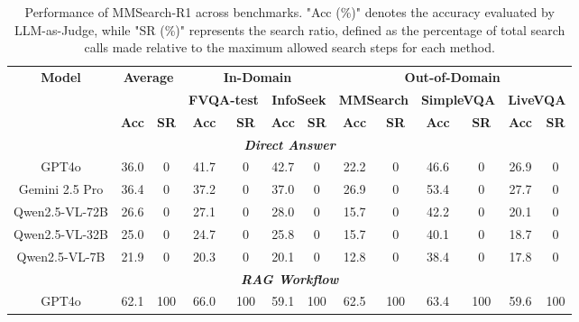 \documentclass{article}
\begin{document}
\begin{table}[t]
\footnotesize
\centering
\caption{Performance of MMSearch-R1 across benchmarks. 
"Acc (\%)" denotes the accuracy evaluated by LLM-as-Judge, while "SR (\%)" represents the search ratio, defined as the percentage of total search calls made relative to the maximum allowed search steps for each method.}
\label{tab:finding-1}
\setlength{\tabcolsep}{4.5pt}
\begin{tabular}{ccccccccccccc}
\toprule
\multicolumn{1}{c|}{\multirow{3}{*}{\textbf{Model}}} & \multicolumn{2}{c|}{\multirow{2}{*}{\textbf{Average}}} & \multicolumn{4}{c|}{\textbf{In-Domain}} & \multicolumn{6}{c}{\textbf{Out-of-Domain}} \\
\multicolumn{1}{c|}{} & \multicolumn{2}{c|}{} & \multicolumn{2}{c}{\textbf{FVQA-test}} & \multicolumn{2}{c|}{\textbf{InfoSeek}} & \multicolumn{2}{c}{\textbf{MMSearch}} & \multicolumn{2}{c}{\textbf{SimpleVQA}} & \multicolumn{2}{l}{\textbf{LiveVQA}} \\
\multicolumn{1}{c|}{} & \textbf{Acc} & \multicolumn{1}{c|}{\textbf{SR}} & \textbf{Acc} & \textbf{SR} & \textbf{Acc} & \multicolumn{1}{c|}{\textbf{SR}} & \textbf{Acc} & \textbf{SR} & \textbf{Acc} & \textbf{SR} & \multicolumn{1}{c}{\textbf{Acc}} & \multicolumn{1}{c}{\textbf{SR}} \\ \midrule
\multicolumn{13}{c}{\textit{\textbf{Direct Answer}}} \\ \midrule
\multicolumn{1}{c|}{GPT4o} & 36.0 & \multicolumn{1}{c|}{0} & 41.7 & 0 & 42.7 & \multicolumn{1}{c|}{0} & 22.2 & 0 & 46.6 & 0 & 26.9 & 0 \\
\multicolumn{1}{c|}{Gemini 2.5 Pro} & 36.4 & \multicolumn{1}{c|}{0} & 37.2 & 0 & 37.0 & \multicolumn{1}{c|}{0} & 26.9 & 0 & 53.4 & 0 & 27.7 & 0 \\
\multicolumn{1}{c|}{Qwen2.5-VL-72B} & 26.6 & \multicolumn{1}{c|}{0} & 27.1 & 0 & 28.0 & \multicolumn{1}{c|}{0} & 15.7 & 0 & 42.2 & 0 & 20.1 & 0 \\
\multicolumn{1}{c|}{Qwen2.5-VL-32B} & 25.0 & \multicolumn{1}{c|}{0} & 24.7 & 0 & 25.8 & \multicolumn{1}{c|}{0} & 15.7 & 0 & 40.1 & 0 & 18.7 & 0 \\
\multicolumn{1}{c|}{Qwen2.5-VL-7B} & 21.9 & \multicolumn{1}{c|}{0} & 20.3 & 0 & 20.1 & \multicolumn{1}{c|}{0} & 12.8 & 0 & 38.4 & 0 & 17.8 & 0 \\ \midrule
\multicolumn{13}{c}{\textit{\textbf{RAG Workflow}}} \\ \midrule
\multicolumn{1}{c|}{GPT4o} & 62.1 & \multicolumn{1}{c|}{100} & 66.0 & 100 & 59.1 & \multicolumn{1}{c|}{100} & 62.5 & 100 & 63.4 & 100 & 59.6 & 100 \\

\end{tabular}
\end{table}
\end{document}

